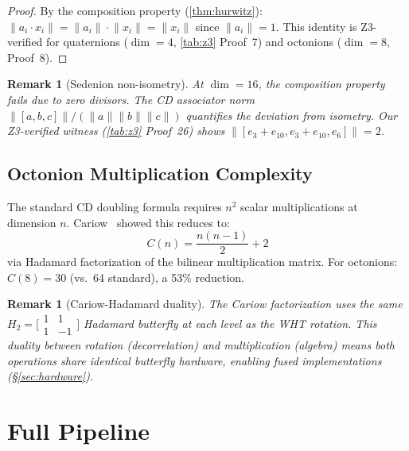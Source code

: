\documentclass[sigconf,anonymous,review]{acmart}
\newtheorem{remark}[theorem]{Remark}
\newcommand{\norm}[1]{\lVert #1 \rVert}
\begin{document}
\begin{proof}
By the composition property (\ref{thm:hurwitz}):
$\norm{a_i \cdot x_i} = \norm{a_i} \cdot \norm{x_i} = \norm{x_i}$
since $\norm{a_i} = 1$. This identity is Z3-verified for quaternions
($\dim=4$, \ref{tab:z3} Proof~7) and octonions ($\dim=8$, Proof~8).
\end{proof}

\begin{remark}[Sedenion non-isometry]
At $\dim = 16$, the composition property fails due to zero divisors.
The \emph{CD associator norm}
$\norm{[a,b,c]} / (\norm{a}\norm{b}\norm{c})$
quantifies the deviation from isometry. Our Z3-verified witness
(\ref{tab:z3} Proof~26) shows $\norm{[e_3{+}e_{10}, e_3{+}e_{10}, e_6]} = 2$.
\end{remark}

\subsection{Octonion Multiplication Complexity}

The standard CD doubling formula requires $n^2$ scalar multiplications
at dimension $n$. Cariow~\cite{cariow2012} showed this reduces to:
\begin{equation}
  C(n) = \frac{n(n-1)}{2} + 2
  \label{eq:cariow}
\end{equation}
via Hadamard factorization of the bilinear multiplication matrix.
For octonions: $C(8) = 30$ (vs.\ 64 standard), a 53\% reduction.

\begin{remark}[Cariow-Hadamard duality]
\label{rem:duality}
The Cariow factorization uses the same $H_2 = \bigl[\begin{smallmatrix}
1 & 1 \\ 1 & -1 \end{smallmatrix}\bigr]$ Hadamard butterfly at each
level as the WHT rotation. This \emph{duality} between rotation
(decorrelation) and multiplication (algebra) means both operations
share identical butterfly hardware, enabling fused implementations
(\S\ref{sec:hardware}).
\end{remark}

\section{Full Pipeline}
\label{sec:pipeline}
\end{document}
